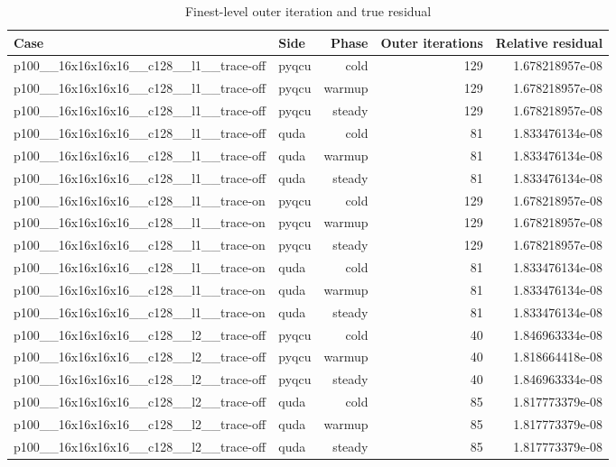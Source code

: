 \begin{table}[htbp]
\centering
\caption{Finest-level outer iteration and true residual}
\small
\begin{tabular}{@{}llrrr@{}}
\toprule
Case & Side & Phase & Outer iterations & Relative residual \\
\midrule
p100\_\_16x16x16x16\_\_c128\_\_l1\_\_trace-off & pyqcu & cold & 129 & 1.678218957e-08 \\
p100\_\_16x16x16x16\_\_c128\_\_l1\_\_trace-off & pyqcu & warmup & 129 & 1.678218957e-08 \\
p100\_\_16x16x16x16\_\_c128\_\_l1\_\_trace-off & pyqcu & steady & 129 & 1.678218957e-08 \\
p100\_\_16x16x16x16\_\_c128\_\_l1\_\_trace-off & quda & cold & 81 & 1.833476134e-08 \\
p100\_\_16x16x16x16\_\_c128\_\_l1\_\_trace-off & quda & warmup & 81 & 1.833476134e-08 \\
p100\_\_16x16x16x16\_\_c128\_\_l1\_\_trace-off & quda & steady & 81 & 1.833476134e-08 \\
p100\_\_16x16x16x16\_\_c128\_\_l1\_\_trace-on & pyqcu & cold & 129 & 1.678218957e-08 \\
p100\_\_16x16x16x16\_\_c128\_\_l1\_\_trace-on & pyqcu & warmup & 129 & 1.678218957e-08 \\
p100\_\_16x16x16x16\_\_c128\_\_l1\_\_trace-on & pyqcu & steady & 129 & 1.678218957e-08 \\
p100\_\_16x16x16x16\_\_c128\_\_l1\_\_trace-on & quda & cold & 81 & 1.833476134e-08 \\
p100\_\_16x16x16x16\_\_c128\_\_l1\_\_trace-on & quda & warmup & 81 & 1.833476134e-08 \\
p100\_\_16x16x16x16\_\_c128\_\_l1\_\_trace-on & quda & steady & 81 & 1.833476134e-08 \\
p100\_\_16x16x16x16\_\_c128\_\_l2\_\_trace-off & pyqcu & cold & 40 & 1.846963334e-08 \\
p100\_\_16x16x16x16\_\_c128\_\_l2\_\_trace-off & pyqcu & warmup & 40 & 1.818664418e-08 \\
p100\_\_16x16x16x16\_\_c128\_\_l2\_\_trace-off & pyqcu & steady & 40 & 1.846963334e-08 \\
p100\_\_16x16x16x16\_\_c128\_\_l2\_\_trace-off & quda & cold & 85 & 1.817773379e-08 \\
p100\_\_16x16x16x16\_\_c128\_\_l2\_\_trace-off & quda & warmup & 85 & 1.817773379e-08 \\
p100\_\_16x16x16x16\_\_c128\_\_l2\_\_trace-off & quda & steady & 85 & 1.817773379e-08 \\

\end{tabular}
\end{table}
